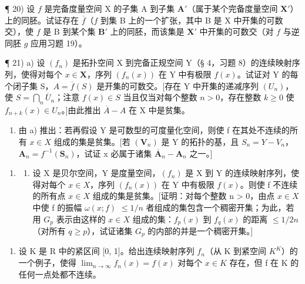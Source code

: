 ¶ 20) 设 \(f\) 是完备度量空间 X 的子集 A 到子集 \(\mathbf{A}'\)（属于某个完备度量空间 \(\mathbf{X}'\)）上的同胚。试证存在 \(\overline{f}\)（\(f\) 到集 B 上的一个扩张，其中 B 是 X 中开集的可数交），使 \(f\) 是 B 到某个集 \(\mathbf{B}'\) 上的同胚，而该集是 \(\mathbf{X}'\) 中开集的可数交（对 \(f\) 与逆同胚 \(g\) 应用习题 19）。

¶ 21) a) 设 \((f_n)\) 是拓扑空间 X 到完备正规空间 Y（§ 4，习题 8）的连续映射序列，使得对每个 \(x \in \mathbf{X}\)，序列 \((f_n(x))\) 在 Y 中有极限 \(f(x)\)。试证对 Y 的每个闭子集 S，\(A = \overline{f}(S)\) 是开集的可数交。{[}存在 Y 中开集的递减序列 \((U_n)\)，使 \(S = \bigcap_{n} \overline{U}_n\)；注意 \(f(x) \in S\) 当且仅当对每个整数 \(n > 0\)，存在整数 \(k \geqslant 0\) 使 \(f_{n+k}(x) \in U_n\)。{]}由此推出 \(\overline{A} - A\) 在 X 中是贫集。

\begin{enumerate}
\def\labelenumi{\alph{enumi})}
\setcounter{enumi}{1}
\tightlist
\item
  由 a) 推出：若再假设 Y 是可数型的可度量化空间，则使 f 在其处不连续的所有 \(x \in X\) 组成的集是贫集。{[}若 \((\mathbf{V}_{n})\) 是 Y 的拓扑的基，且 \(S_{n} = Y - V_{n}\)，\(\mathbf{A}_{n} = f^{-1}(\mathbf{S}_{n})\)，试证 x 必属于诸集 \(\overline{\mathbf{A}}_{n} - \mathbf{A}_{n}\) 之一。{]}
\end{enumerate}

\begin{enumerate}
\def\labelenumi{\arabic{enumi})}
\setcounter{enumi}{21}
\tightlist
\item
  \begin{enumerate}
  \def\labelenumii{\alph{enumii})}
  \tightlist
  \item
    设 X 是贝尔空间，Y 是度量空间，\((f_{n})\) 是 X 到 Y 的连续映射序列，使得对每个 \(x \in X\)，序列 \((f_{n}(x))\) 在 Y 中有极限 \(f(x)\)。则使 f 不连续的所有点 \(x \in X\) 组成的集是贫集。{[}证明：对每个整数 n \textgreater{} 0，由点 \(x \in X\) 中使 f 的振幅 \(\omega(x; f)\) \(\leqslant 1/n\) 者组成的集包含一个稠密开集；为此，若用 \(G_{p}\) 表示由这样的 \(x \in X\) 组成的集：\(f_{p}(x)\) 到 \(f_{q}(x)\) 的距离 \(\leqslant 1/2n\)（对所有 \(q \geqslant p\)），试证诸集 \(G_{p}\) 的内部的并是一个稠密开集。{]}
  \end{enumerate}
\end{enumerate}

\begin{enumerate}
\def\labelenumi{\alph{enumi})}
\setcounter{enumi}{1}
\tightlist
\item
  设 K 是 R 中的紧区间 {[}0, 1{]}。给出连续映射序列 \(f_{n}\)（从 K 到紧空间 \(K^{K}\)）的一个例子，使得 \(\lim_{n\to\infty}f_{n}(x)=f(x)\) 对每个 \(x\in K\) 存在，但 f 在 K 的任何一点处都不连续。
\end{enumerate}

